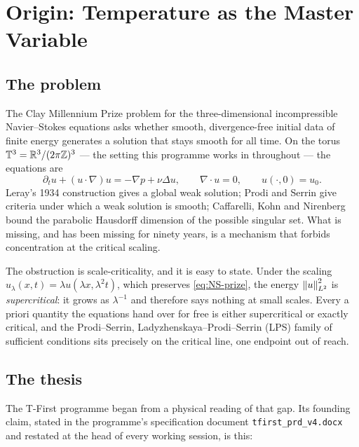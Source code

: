 \chapter{Origin: Temperature as the Master Variable}
\label{ch:origin}

\section{The problem}
\label{sec:the-problem}

The Clay Millennium Prize problem for the three-dimensional incompressible
Navier--Stokes equations asks whether smooth, divergence-free initial data of
finite energy generates a solution that stays smooth for all time. On the
torus \(\mathbb{T}^3=\mathbb{R}^3/(2\pi\mathbb{Z})^3\) --- the setting this programme works in
throughout --- the equations are
\begin{equation}\label{eq:NS-prize}
  \partial_t u + (u\cdot\nabla)u = -\nabla p + \nu\Delta u,
  \qquad \nabla\cdot u = 0,
  \qquad u(\cdot,0)=u_0 .
\end{equation}
Leray's 1934 construction gives a global weak solution; Prodi and Serrin give
criteria under which a weak solution is smooth; Caffarelli, Kohn and Nirenberg
bound the parabolic Hausdorff dimension of the possible singular set. What is
missing, and has been missing for ninety years, is a mechanism that forbids
concentration at the critical scaling.

The obstruction is scale-criticality, and it is easy to state. Under the
scaling \(u_\lambda(x,t)=\lambda u(\lambda x,\lambda^2t)\), which preserves
\eqref{eq:NS-prize}, the energy \(\left\|u\right\|_{L^2}^2\) is \emph{supercritical}:
it grows as \(\lambda^{-1}\) and therefore says nothing at small scales. Every
a priori quantity the equations hand over for free is either supercritical or
exactly critical, and the Prodi--Serrin, Ladyzhenskaya--Prodi--Serrin (LPS)
family of sufficient conditions sits precisely on the critical line, one
endpoint out of reach.

\section{The thesis}
\label{sec:the-thesis}

The T-First programme began from a physical reading of that gap. Its
founding claim, stated in the programme's specification document
\texttt{tfirst\_prd\_v4.docx} and restated at the head of every working
session, is this:

